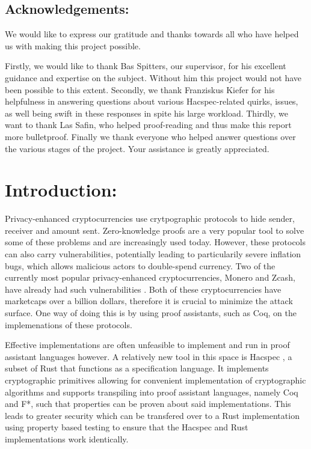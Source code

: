 \documentclass{article}
\begin{document}
\subsection*{Acknowledgements:}

We would like to express our gratitude and thanks towards all who have
helped us with making this project possible.

Firstly, we would like to thank Bas Spitters, our supervisor, for his
excellent guidance and expertise on the subject. Without him this
project would not have been possible to this extent. Secondly, we
thank Franziskus Kiefer for his helpfulness in answering questions
about various Hacspec-related quirks, issues, as well being swift
in these responses in spite his large workload. Thirdly, we want to
thank Las Safin, who helped proof-reading and thus make this report more
bulletproof. Finally we thank everyone who helped answer questions
over the various stages of the project. Your assistance is greatly
appreciated.

\tableofcontents

\newpage


\section{Introduction:} \label{Introduction}

Privacy-enhanced cryptocurrencies use crytpographic protocols to hide
sender, receiver and amount sent. Zero-knowledge proofs are a very
popular tool to solve some of these problems and are increasingly
used today. However, these protocols can also carry vulnerabilities,
potentially leading to particularily severe inflation bugs, which
allows malicious actors to double-spend currency. Two of the currently
most popular privacy-enhanced cryptocurrencies, Monero and Zcash, have
already had such vulnerabilities \cite{cryptonote} \cite{zcash}. Both of
these cryptocurrencies have marketcaps over a billion dollars, therefore
it is crucial to minimize the attack surface. One way of doing this
is by using proof assistants, such as Coq, on the implemenations of
these protocols.

Effective implementations are often unfeasible to implement and run
in proof assistant languages however. A relatively new tool in this
space is Hacspec \cite{hacspec}, a subset of Rust that functions
as a specification language. It implements cryptographic primitives
allowing for convenient implementation of cryptographic algorithms and
supports transpiling into proof assistant languages, namely Coq and F*,
such that properties can be proven about said implementations. This
leads to greater security which can be transfered over to a Rust
implementation using property based testing to ensure that the Hacspec
and Rust implementations work identically.
\end{document}
